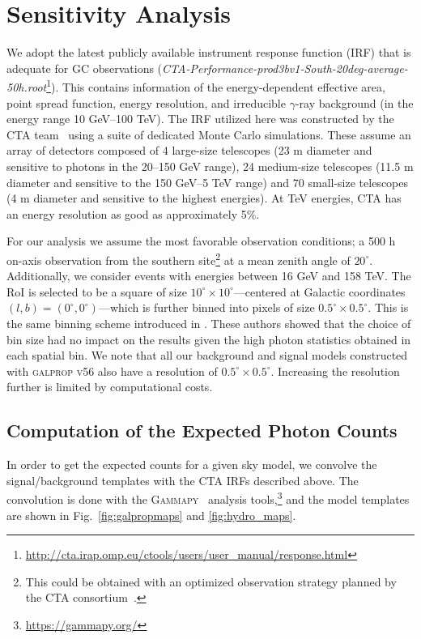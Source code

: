 \documentclass[doublespace,draft,nopageskip]{VTthesis} %
\begin{document}
\section{Sensitivity Analysis}
\label{sec:sensitivity}

We adopt the latest publicly available instrument response function (IRF) that is adequate for GC observations (\textit{CTA-Performance-prod3bv1-South-20deg-average-50h.root}\footnote{\url{http://cta.irap.omp.eu/ctools/users/user_manual/response.html}}). This contains information of the energy-dependent effective area, point spread function, energy resolution, and irreducible $\gamma$-ray background (in the energy range 10 GeV--100 TeV). The IRF utilized here was constructed by the CTA team~\citep{CTA_IRFs:2015} using a suite of dedicated Monte Carlo simulations. These assume an array of detectors composed of 4 large-size telescopes (23 m diameter and sensitive to photons in the 20--150 GeV range),  24 medium-size telescopes (11.5 m diameter and sensitive to the 150 GeV--5 TeV range) and 70 small-size telescopes (4 m diameter and sensitive to the highest energies). At TeV energies, CTA has an energy resolution as good as approximately 5\%.


For our analysis we assume the most favorable observation conditions; a 500 h on-axis observation from the southern site\footnote{This could be obtained with an optimized observation strategy planned by the CTA consortium~\citep{Acharyya:2020sbj}.} at a mean zenith angle of $20^\circ$. Additionally, we consider events with energies between 16 GeV and 158 TeV. The RoI is selected to be a square of size $10^\circ \times 10^\circ$---centered at Galactic coordinates $(l,b)=(0^\circ, 0^\circ)$---which is further binned into pixels of size $0.5^\circ \times 0.5^\circ$. This is the same binning scheme introduced in \cite{Rinchiuso:2020skh}. These authors showed that the choice of bin size had no impact on the results given the high photon statistics obtained in each spatial bin. We note that all our background and signal models constructed with \textsc{galprop v56} also have a resolution of $0.5^\circ \times 0.5^\circ$. Increasing the resolution further is limited by computational costs.  

\subsection{Computation of the Expected Photon Counts }
\label{subsec:expectedcounts}

In order to get the expected counts for a given sky model, we convolve the signal/background templates with the CTA IRFs described above. The convolution is done with the \textsc{Gammapy}~\citep{gammapy:2017,gammapy:2019} analysis tools,\footnote{\url{https://gammapy.org/}} and the model templates are shown in Fig.~\ref{fig:galpropmaps} and \ref{fig:hydro_maps}.
\end{document}

